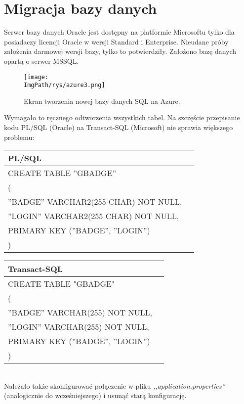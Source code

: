 \documentclass[a4paper,12pt,twoside,openany]{report}
\newcommand{\ImgPath}{.}
\begin{document}
\section{Migracja bazy danych}
Serwer bazy danych Oracle jest dostępny na platformie Microsoftu tylko dla posiadaczy licencji Oracle w wersji Standard i Enterprise. Nieudane próby założenia darmowej wersji bazy, tylko to potwierdziły. Założono bazę danych opartą o serwer MSSQL.
				\begin{figure}[!htbp]
					\begin{center}
						\centering
						\texttt{[image: \\ImgPath/rys/azure3.png]}
					\end{center}
					\caption{Ekran tworzenia nowej bazy danych SQL na Azure.}
					\label{UMLTS}
				\end{figure}
Wymagało to ręcznego odtworzenia wszystkich tabel. Na szczęście przepisanie kodu PL/SQL (Oracle) na Transact-SQL (Microsoft) nie sprawia większego problemu:\\
\begin{tabular}{|p{7cm}|p{7cm}|}
	\hline PL/SQL\\ 
	\hline   CREATE TABLE ''GBADGE''  \\
	(\\	
	''BADGE'' VARCHAR2(255 CHAR) NOT NULL, \\
	''LOGIN'' VARCHAR2(255 CHAR) NOT NULL,  \\
	PRIMARY KEY (''BADGE'', ''LOGIN'')\\
	)\\
	\hline 
\end{tabular} 
\begin{tabular}{|p{7cm}|p{7cm}|}
	\hline Transact-SQL\\ 
	\hline CREATE TABLE "GBADGE" \\
	(\\
	''BADGE'' VARCHAR(255) NOT NULL, \\
	''LOGIN'' VARCHAR(255) NOT NULL, \\
	PRIMARY KEY (''BADGE'', ''LOGIN'')\\
	)\\
	\hline 
\end{tabular}\\
Należało także skonfigurować połączenie w pliku \textit{,,application.properties''} (analogicznie do wcześniejszego) i usunąć starą konfigurację.
\end{document}
